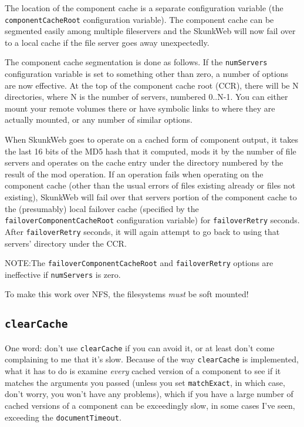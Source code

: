 \documentclass[titlepage]{manual}
\begin{document}
The location of the component cache is a separate configuration
variable (the \texttt{componentCacheRoot} configuration variable). The
component cache can be segmented easily among multiple fileservers and
the SkunkWeb will now fail over to a local cache if the file server
goes away unexpectedly.
   
The component cache segmentation is done as follows. If the \texttt{numServers}
configuration variable is set to something other than zero, a number
of options are now effective. At the top of the component cache root
(CCR), there will be N directories, where N is the number of servers,
numbered 0..N-1. You can either mount your remote volumes there or
have symbolic links to where they are actually mounted, or any number
of similar options.
   
When SkunkWeb goes to operate on a cached form of component output, it
takes the last 16 bits of the MD5 hash that it computed, mods it by
the number of file servers and operates on the cache entry under the
directory numbered by the result of the mod operation. If an operation
fails when operating on the component cache (other than the usual
errors of files existing already or files not existing), SkunkWeb will
fail over that servers portion of the component cache to the
(presumably) local failover cache (specified by the
\texttt{failoverComponentCacheRoot} configuration variable) for
\texttt{failoverRetry} seconds. After \texttt{failoverRetry} seconds,
it will again attempt to go back to using that servers' directory
under the CCR.
   
   NOTE:The \texttt{failoverComponentCacheRoot} and
   \texttt{failoverRetry} options are ineffective if
   \texttt{numServers} is zero.

To make this work over NFS, the filesystems \emph{must} be soft mounted!

\subsection{\texttt{clearCache}}
\label{clearCache}
One word: don't use \texttt{clearCache} if you can avoid it, or at
least don't come complaining to me that it's slow.  Because of the way
\texttt{clearCache} is implemented, what it has to do is examine
\emph{every} cached version of a component to see if it matches the
arguments you passed (unless you set \texttt{matchExact}, in which
case, don't worry, you won't have any problems), which if you have a
large number of cached versions of a component can be exceedingly
slow, in some cases I've seen, exceeding the \texttt{documentTimeout}.
\end{document}
